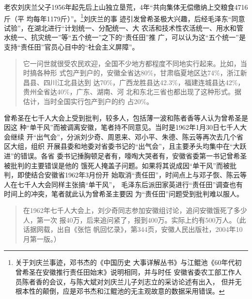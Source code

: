 老农刘庆兰父子1956年起先后上山独立垦荒，4年``共向集体无偿缴纳上交粮食4716斤（平
均每年1179斤）''。\cite{anhuiliushi}\footnote{关于刘庆兰事迹，邓书杰的《中国历史
  大事详解丛书》与江鲲池《60年代初曾希圣在安徽推行责任田始末》说明相同，并与时任
  安徽省委农工部工作人员陈者香的会议，与陈大斌对刘庆兰儿子刘志立的采访论述有出入，
  但并无根本性的颠倒，应是邓书杰和江鲲池的无主观故意的数据采用错误。}刘庆兰的事
迹引发曾希圣极大兴趣，后经毛泽东``同意试验''，在湖北进行``计划统一、分配统一、大
农活和技术性农活统一、用水和管水统一、抗灾统一''等``五个统一''之下的``责任田''推
广，可以认为这``五个统一''是支持``责任田''官员心目中的``社会主义屏障''。

\begin{quotation}
  它一问世就很受农民欢迎，全国不少地方都程度不同地实行起来。比如，当时搞各种形
  式包产到户的，安徽全省达80\%，甘肃临夏地区达74\%，浙江新昌县、四川江北县达到
  达70\%，广西龙胜县达42.3\%，福建连城县达42\%，贵州全省达40\%，广东、湖南、河
  北和东北三省也都出现了这种形式。据估计，当时全国实行包产到户的约
  占20\%。
\end{quotation}

曾希圣在七千人大会上受到批判，较多人，包括薄一波和陈者香等人认为曾希圣是因这
种``单干风''而被调离安徽，笔者持不同意见。当时是1962年1月30日七千人大会继续
开``出气会''，分派刘少奇、周恩来、邓小平、朱德、陈云等再次去几个省区大组，组织
开展县委和地委对省委书记的``出气会''，且主要矛头均集中在``大跃进''的错误。各省
委书记捶胸顿足者有，嚎啕大哭者有，安徽省委第一书记曾希圣被批判的主要错误是他的
饿死人掩盖子问题。如果将其说成因``单干风''而被批判，即使结合安徽省1962年3月份开
始取消``责任田''，时间点上与邓子恢、陈云等人在七千人大会同样主张搞``单干风''，
毛泽东后派田家英进行``责任田''调查也有时间上的冲突，笔者就此认为曾希圣主要因
为``责任田''问题受到批判难以服人。

\begin{quotation}
  在1962年七千人大会上，刘少奇同志参加安徽组讨论，追问安徽饿死了多少人，第一次
  报40万，后来追问紧了，报到400万。实际上约有500万人。（此话据网载，出自《张恺
  帆回忆录》，第344页，安徽人民出版社，2004年10月第一版。）
\end{quotation}

